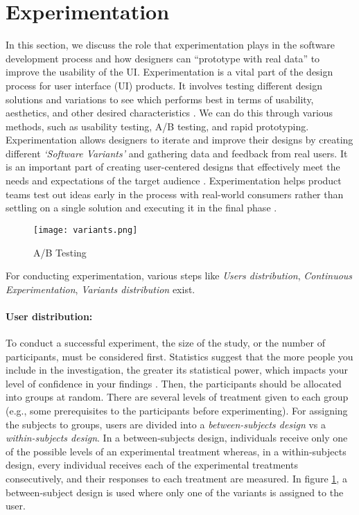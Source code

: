\section{Experimentation}
\label{background:section:experimentproduct}
In this section, we discuss the role that experimentation plays in the software development process and how designers can ``prototype with real data'' to improve the usability of the UI.
Experimentation is a vital part of the design process for user interface (UI) products. 
It involves testing different design solutions and variations to see which performs best in terms of usability, aesthetics, and other desired characteristics \cite{article:controlled:experiements}. 
We can do this through various methods, such as usability testing, A/B testing, and rapid prototyping.
Experimentation allows designers to iterate and improve their designs by creating different \textit{`Software Variants'} and gathering data and feedback from real users.
It is an important part of creating user-centered designs that effectively meet the needs and expectations of the target audience \cite{article:experiments:lindgren}.
Experimentation helps product teams test out ideas early in the process with real-world consumers rather than settling on a single solution and executing it in the final phase \cite{misc:CE:miklos}.

\begin{figure}[htbp!]
  \centering    
  \texttt{[image: variants.png]}
  \caption[A/B Testing]{A/B Testing} 
  \label{fig:background:abtesting}
\end{figure}
For conducting experimentation, various steps like \textit{Users distribution}, \textit{Continuous Experimentation}, \textit{Variants distribution} exist.  

\paragraph{User distribution:} To conduct a successful experiment, the size of the study, or the number of participants, must be considered first.
Statistics suggest that the more people you include in the investigation, the greater its statistical power, which impacts your level of confidence in your findings \cite{misc:experimentation:users}.
Then, the participants should be allocated into groups at random. 
There are several levels of treatment given to each group (e.g., some prerequisites to the participants before experimenting).
For assigning the subjects to groups, users are divided into a \textit{between-subjects design} vs a \textit{within-subjects design}.
In a between-subjects design, individuals receive only one of the possible levels of an experimental treatment whereas, in a within-subjects design, every individual receives each of the experimental treatments consecutively, and their responses to each treatment are measured.
In figure \ref{fig:background:abtesting}, a between-subject design is used where only one of the variants is assigned to the user.

